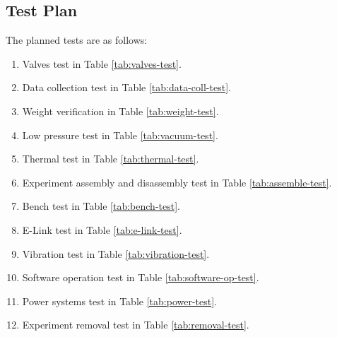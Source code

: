 \pagebreak
\subsection{Test Plan}

The planned tests are as follows:

\begin{enumerate}
    \item Valves test in Table \ref{tab:valves-test}.
    \item Data collection test in Table \ref{tab:data-coll-test}.
    \item Weight verification in Table \ref{tab:weight-test}.
    \item Low pressure test in Table \ref{tab:vacuum-test}.
    \item Thermal test in Table \ref{tab:thermal-test}.
    \item Experiment assembly and disassembly test in Table \ref{tab:assemble-test}.
    \item Bench test in Table \ref{tab:bench-test}.
    \item E-Link test in Table \ref{tab:e-link-test}.
    \item Vibration test in Table \ref{tab:vibration-test}.
    \item Software operation test in Table \ref{tab:software-op-test}.
    \item Power systems test in Table \ref{tab:power-test}.
    \item Experiment removal test in Table \ref{tab:removal-test}.
\end{enumerate}















